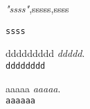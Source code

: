 \begin{thebibliography}{99}

\textit{"ssss"},sssss,ssss 
  
\texttt{ssss}

ddddddddd
\textit{ddddd}.\\
\texttt{dddddddd}

aaaaa
\textit{aaaaa}.\\
\texttt{aaaaaa}

\end{thebibliography}